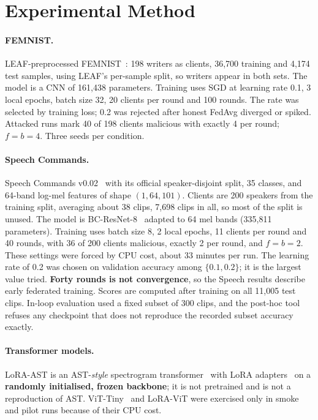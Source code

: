 \section{Experimental Method}
\label{sec:method}

\paragraph{FEMNIST.}
LEAF-preprocessed FEMNIST~\cite{caldas2018leaf}: 198 writers as clients, 36{,}700 training and 4{,}174 test samples, using LEAF's per-sample split, so writers appear in both sets. The model is a CNN of 161{,}438 parameters. Training uses SGD at learning rate 0.1, 3 local epochs, batch size 32, 20 clients per round and 100 rounds. The rate was selected by training loss; 0.2 was rejected after honest FedAvg diverged or spiked. Attacked runs mark 40 of 198 clients malicious with exactly 4 per round; $f=b=4$. Three seeds per condition.

\paragraph{Speech Commands.}
Speech Commands v0.02~\cite{warden2018speech} with its official speaker-disjoint split, 35 classes, and 64-band log-mel features of shape $(1,64,101)$. Clients are 200 speakers from the training split, averaging about 38 clips, 7{,}698 clips in all, so most of the split is unused. The model is BC-ResNet-8~\cite{kim2021bcresnet} adapted to 64 mel bands (335{,}811 parameters). Training uses batch size 8, 2 local epochs, 11 clients per round and 40 rounds, with 36 of 200 clients malicious, exactly 2 per round, and $f=b=2$. These settings were forced by CPU cost, about 33 minutes per run. The learning rate of 0.2 was chosen on validation accuracy among $\{0.1,0.2\}$; it is the largest value tried. \textbf{Forty rounds is not convergence}, so the Speech results describe early federated training. Scores are computed after training on all 11{,}005 test clips. In-loop evaluation used a fixed subset of 300 clips, and the post-hoc tool refuses any checkpoint that does not reproduce the recorded subset accuracy exactly.

\paragraph{Transformer models.}
LoRA-AST is an AST-\emph{style} spectrogram transformer~\cite{gong2021ast} with LoRA adapters~\cite{hu2022lora} on a \textbf{randomly initialised, frozen backbone}; it is not pretrained and is not a reproduction of AST. ViT-Tiny~\cite{dosovitskiy2021vit} and LoRA-ViT were exercised only in smoke and pilot runs because of their CPU cost.

